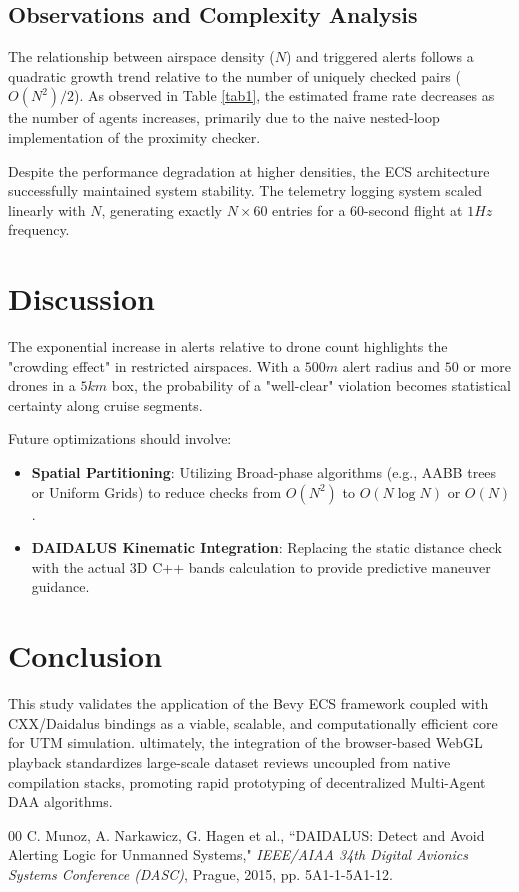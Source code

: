 \documentclass[conference]{IEEEtran}
\begin{document}
\subsection{Observations and Complexity Analysis}
The relationship between airspace density ($N$) and triggered alerts follows a quadratic growth trend relative to the number of uniquely checked pairs ($O(N^2)/2$). As observed in Table \ref{tab1}, the estimated frame rate decreases as the number of agents increases, primarily due to the naive nested-loop implementation of the proximity checker. 

Despite the performance degradation at higher densities, the ECS architecture successfully maintained system stability. The telemetry logging system scaled linearly with $N$, generating exactly $N \times 60$ entries for a 60-second flight at $1Hz$ frequency.

\section{Discussion}
The exponential increase in alerts relative to drone count highlights the "crowding effect" in restricted airspaces. With a $500m$ alert radius and $50$ or more drones in a $5km$ box, the probability of a "well-clear" violation becomes statistical certainty along cruise segments. 

Future optimizations should involve:
\begin{itemize}
    \item \textbf{Spatial Partitioning}: Utilizing Broad-phase algorithms (e.g., AABB trees or Uniform Grids) to reduce checks from $O(N^2)$ to $O(N \log N)$ or $O(N)$.
    \item \textbf{DAIDALUS Kinematic Integration}: Replacing the static distance check with the actual 3D C++ bands calculation to provide predictive maneuver guidance.
\end{itemize}

\section{Conclusion}
This study validates the application of the Bevy ECS framework coupled with CXX/Daidalus bindings as a viable, scalable, and computationally efficient core for UTM simulation. ultimately, the integration of the browser-based WebGL playback standardizes large-scale dataset reviews uncoupled from native compilation stacks, promoting rapid prototyping of decentralized Multi-Agent DAA algorithms.

\begin{thebibliography}{00}
 C. Munoz, A. Narkawicz, G. Hagen et al., ``DAIDALUS: Detect and Avoid Alerting Logic for Unmanned Systems," \textit{IEEE/AIAA 34th Digital Avionics Systems Conference (DASC)}, Prague, 2015, pp. 5A1-1-5A1-12.
\end{thebibliography}
\end{document}
